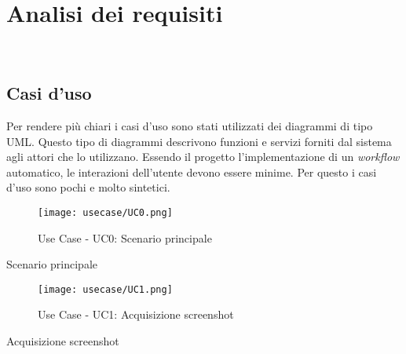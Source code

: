 \chapter{Analisi dei requisiti}
\label{cap:analisi-requisiti}

\\

\section{Casi d'uso}
Per rendere più chiari i casi d'uso sono stati utilizzati dei diagrammi di tipo \gls{UML}\glsfirstoccur.
Questo tipo di diagrammi descrivono funzioni e servizi forniti dal sistema agli attori che lo utilizzano.
Essendo il progetto l'implementazione di un \emph{\gls{workflow}} automatico, le interazioni dell'utente devono essere minime.
Per questo i casi d'uso sono pochi e molto sintetici.

\begin{figure}[!h] 
    \centering 
    \texttt{[image: usecase/UC0.png]} 
    \caption{Use Case - UC0: Scenario principale}
\end{figure}

\begin{usecase}{0}{Scenario principale}
    \label{uc:scenario-principale}
\end{usecase}

\begin{figure}[!h] 
    \centering 
    \texttt{[image: usecase/UC1.png]} 
    \caption{Use Case - UC1: Acquisizione screenshot}
\end{figure}

\begin{usecase}{1}{Acquisizione screenshot} 
    \label{uc:acquisizione-screenshot} 
\end{usecase}
 

